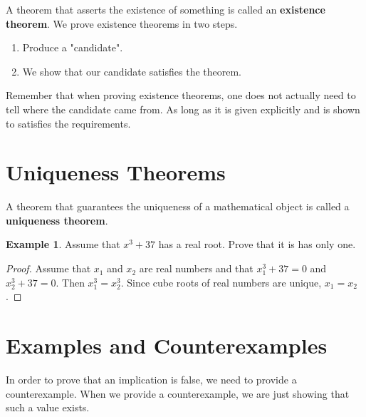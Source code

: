 \documentclass[a4paper, 11pt]{report}
\theoremstyle{plain}
\theoremstyle{definition}
\newtheorem{exmp}[thm]{Example}
\begin{document}
A theorem that asserts the existence of something is called an \textbf{existence theorem}. We prove existence theorems in two steps.
\begin{enumerate}
  \item Produce a "candidate". 
  \item We show that our candidate satisfies the theorem.
\end{enumerate}

Remember that when proving existence theorems, one does not actually need to
tell where the candidate came from. As long as it is given explicitly and is
shown to satisfies the requirements.

\section{Uniqueness Theorems}
\label{sec:uniqueness_theorems}

A theorem that guarantees the uniqueness of a mathematical object is called a
\textbf{uniqueness theorem}.
\begin{exmp}
  Assume that $x^3 + 37$ has a real root. Prove that it is has only one.
  \begin{proof}
    Assume that $x_1$ and $x_2$ are real numbers and that $x_1^3 + 37 = 0$ and
    $x_2^3 + 37 = 0$. Then $x_1 ^3 = x_2^3$. Since cube roots of real numbers
    are unique, $x_1 = x_2$.
  \end{proof}
\end{exmp}

\section{Examples and Counterexamples}
\label{sec:examples_and_counterexamples}

In order to prove that an implication is false, we need to provide a counterexample.
When we provide a counterexample, we are just showing that such a value exists. 
\end{document}
